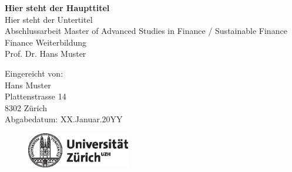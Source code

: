 \documentclass[11pt,a4paper,titlepage]{scrartcl}
\begin{document}
\newpage

\thispagestyle{plain}
\begin{titlepage}

\begin{center}

\huge{\textbf{Hier steht der Haupttitel}}\\[1.5ex]
\LARGE{Hier steht der Untertitel}\\[6ex]
\Large{Abschlussarbeit Master of Advanced Studies in Finance / Sustainable Finance \\
Finance Weiterbildung}\\[1.5ex]
\Large{Prof. Dr. Hans Muster}\\[12	ex]


\end{center}


\normalsize
\begin{flushleft}
Eingereicht von:\\[3ex]
Hans Muster\\[1ex]
Plattenstrasse 14\\[1ex]
8302 Zürich\\[3ex]

Abgabedatum: XX.Januar.20YY\\[10ex]
\end{flushleft}

\begin {figure}[h]
\begin {center}
\includegraphics [width=4.5cm] {uzh_logo_d_pos.eps}
\end {center}
\end {figure}


\end{titlepage}





\cfoot{\pagemark}
\newpage
\end{document}
